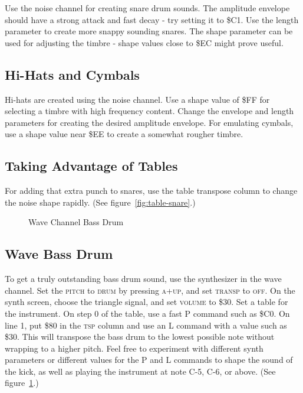 Use the noise channel for creating snare drum sounds. The amplitude envelope should have a strong attack and fast decay - try setting it to \$C1. Use the length parameter to create more snappy sounding snares. The shape parameter can be used for adjusting the timbre - shape values close to \$EC might prove useful.

\subsection{Hi-Hats and Cymbals}

Hi-hats are created using the noise channel. Use a shape value of \$FF for selecting a timbre with high frequency content. Change the envelope and length parameters for creating the desired amplitude envelope. For emulating cymbals, use a shape value near \$EE to create a somewhat rougher timbre.

\subsection{Taking Advantage of Tables}

For adding that extra punch to snares, use the table transpose column to change the noise shape rapidly. (See figure~\ref{fig:table-snare}.)

\begin{figure}[hbtp]
	\centering
	\qquad

	\qquad

	\caption{Wave Channel Bass Drum}
	\label{fig:wavekick}
\end{figure}

\subsection{Wave Bass Drum}

To get a truly outstanding bass drum sound, use the synthesizer in the wave channel. Set the \textsc{pitch} to \textsc{drum} by pressing \textsc{a+up}, and set \textsc{transp} to \textsc{off}. On the synth screen, choose the triangle signal, and set \textsc{volume} to \$30. Set a table for the instrument. On step 0 of the table, use a fast P command such as \$C0. On line 1, put \$80 in the \textsc{tsp} column and use an L command with a value such as \$30. This will transpose the bass drum to the lowest possible note without wrapping to a higher pitch.  Feel free to experiment with different synth parameters or different values for the P and L commands to shape the sound of the kick, as well as playing the instrument at note C-5, C-6, or above. (See figure~\ref{fig:wavekick}.)

